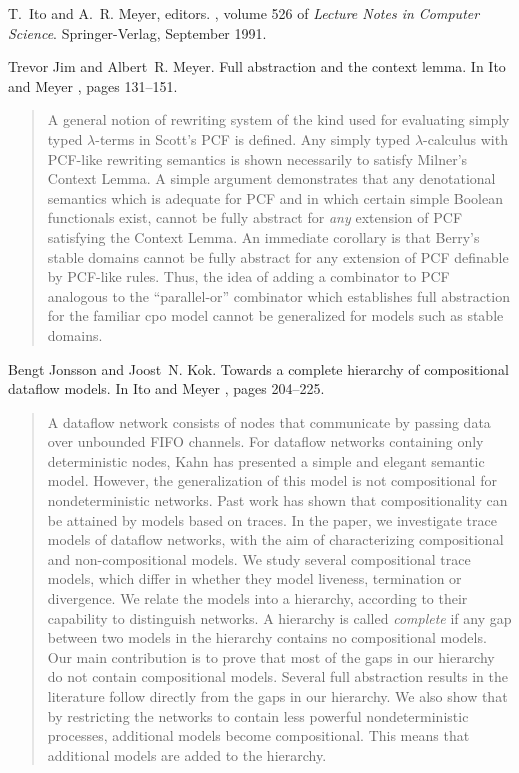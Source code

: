 \begin{thebibliography}{10}
T.~Ito and A.~R. Meyer, editors.
, volume 526 of {\em
  Lecture Notes in Computer Science}. Springer-Verlag, September 1991.

Trevor Jim and Albert~R. Meyer.
\newblock Full abstraction and the context lemma.
\newblock In Ito and Meyer \cite{TACS91}, pages 131--151.
\begin{quotation}
A general notion of rewriting system of the kind used for evaluating simply
  typed $\lambda$-terms in Scott's PCF is defined. Any simply typed
  $\lambda$-calculus with PCF-like rewriting semantics is shown necessarily to
  satisfy Milner's Context Lemma. A simple argument demonstrates that any
  denotational semantics which is adequate for PCF and in which certain simple
  Boolean functionals exist, cannot be fully abstract for {\em any} extension
  of PCF satisfying the Context Lemma. An immediate corollary is that Berry's
  stable domains cannot be fully abstract for any extension of PCF definable by
  PCF-like rules. Thus, the idea of adding a combinator to PCF analogous to the
  ``parallel-or'' combinator which establishes full abstraction for the
  familiar cpo model cannot be generalized for models such as stable domains.
\end{quotation}

Bengt Jonsson and Joost~N. Kok.
\newblock Towards a complete hierarchy of compositional dataflow models.
\newblock In Ito and Meyer \cite{TACS91}, pages 204--225.
\begin{quotation}
A dataflow network consists of nodes that communicate by passing data over
  unbounded FIFO channels. For dataflow networks containing only deterministic
  nodes, Kahn has presented a simple and elegant semantic model. However, the
  generalization of this model is not compositional for nondeterministic
  networks. Past work has shown that compositionality can be attained by models
  based on traces. In the paper, we investigate trace models of dataflow
  networks, with the aim of characterizing compositional and non-compositional
  models. We study several compositional trace models, which differ in whether
  they model liveness, termination or divergence. We relate the models into a
  hierarchy, according to their capability to distinguish networks. A hierarchy
  is called {\it complete} if any gap between two models in the hierarchy
  contains no compositional models. Our main contribution is to prove that most
  of the gaps in our hierarchy do not contain compositional models. Several
  full abstraction results in the literature follow directly from the gaps in
  our hierarchy. We also show that by restricting the networks to contain less
  powerful nondeterministic processes, additional models become compositional.
  This means that additional models are added to the hierarchy.
\end{quotation}


\end{thebibliography}
